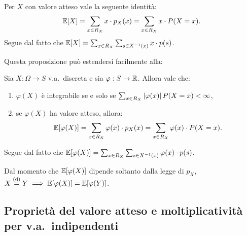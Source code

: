 \begin{multicols*}{2}
\begin{lemma}
    Per $X$ con valore atteso vale la seguente identità:
    \[
        \mathbb{E}[X] = \sum_{x \in R_X} x \cdot p_X(x) = \sum_{x \in R_X} x \cdot P(X = x).
    \]
    Segue dal fatto che $\mathbb{E}[X] = \sum_{x \in R_X} \sum_{s \in X^{-1}(x)} x \cdot p(s)$.
\end{lemma}

Questa proposizione può estendersi facilmente alla:

\begin{proposition}
    Sia $X : \Omega \to S$ v.a.~discreta e sia $\varphi : S \to \mathbb{R}$. Allora vale che:
    \begin{enumerate}[(i.)]
        \item $\varphi(X)$ è integrabile se e solo se $\sum_{x \in R_X} \left\lvert \varphi(x) \right\rvert P(X = x) < \infty$,
        \item se $\varphi(X)$ ha valore atteso, allora:
        \[
            \mathbb{E}[\varphi(X)] = \sum_{x \in R_X} \varphi(x) \cdot p_X(x) = \sum_{x \in R_X} \varphi(x) \cdot P(X = x).
        \]
    \end{enumerate}
    Segue dal fatto che $\mathbb{E}[\varphi(X)] = \sum_{x \in R_X} \sum_{s \in X^{-1}(x)} \varphi(x) \cdot p(s)$.
\end{proposition}

\begin{remark}
    Dal momento che $\mathbb{E}[\varphi(X)]$ dipende soltanto dalla legge di $p_X$,
    $X \overset{\mathrm{(d)}}{=} Y \implies \mathbb{E}[\varphi(X)] = \mathbb{E}[\varphi(Y)]$.
\end{remark}

\subsection{Proprietà del valore atteso e moltiplicatività per v.a.~indipendenti}


\end{multicols*}
